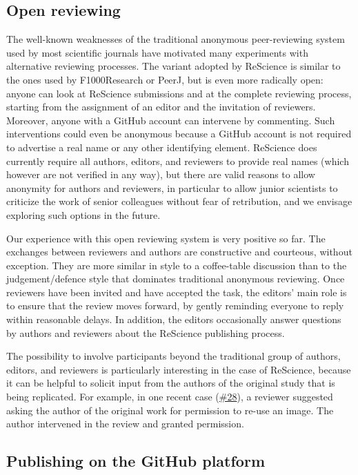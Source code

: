 \documentclass[a4paper,10pt, twocolumn]{article}
\begin{document}
\subsection*{Open reviewing}

The well-known weaknesses of the traditional anonymous peer-reviewing
system used by most scientific journals have motivated many
experiments with alternative reviewing processes. The variant
adopted by ReScience is similar to the ones used by F1000Research or
PeerJ, but is even more radically open: anyone can look at ReScience
submissions and at the complete reviewing process, starting from the
assignment of an editor and the invitation of reviewers. Moreover,
anyone with a GitHub account can intervene by commenting. Such
interventions could even be anonymous because a GitHub account is not
required to advertise a real name or any other identifying
element. ReScience does currently require all authors, editors, and
reviewers to provide real names (which however are not verified in any
way), but there are valid reasons to allow anonymity for authors and
reviewers, in particular to allow junior scientists to criticize the
work of senior colleagues without fear of retribution, and we envisage
exploring such options in the future.

Our experience with this open reviewing system is very positive so
far. The exchanges between reviewers and authors are constructive and
courteous, without exception. They are more similar in style to a
coffee-table discussion than to the judgement/defence style that
dominates traditional anonymous reviewing. Once reviewers have been
invited and have accepted the task, the editors' main role is to
ensure that the review moves forward, by gently reminding everyone to
reply within reasonable delays. In addition, the editors occasionally
answer questions by authors and reviewers about the ReScience
publishing process.

The possibility to involve participants beyond the traditional group of
authors, editors, and reviewers is particularly interesting in the
case of ReScience, because it can be helpful to solicit input from the
authors of the original study that is being replicated. For example,
in one recent case
(\href{https://github.com/ReScience/ReScience-submission/pull/28}{\#28}),
a reviewer suggested asking the author of the original work for
permission to re-use an image. The author intervened in the review and
granted permission.

\subsection*{Publishing on the GitHub platform}
\end{document}
